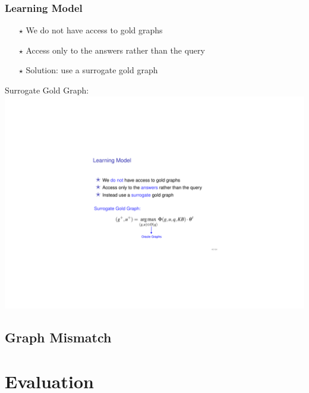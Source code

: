 \documentclass[mathserif,12pt]{beamer}
\newcommand{\hlight}[1]{{\color{blue!80} #1}}
\begin{document}
\begin{frame}
\frametitle{Learning Model}
\large 

\begin{itemize}
 \item[\huge $\star$] We \hlight{do not} have access to gold graphs
 \item[\huge $\star$] Access only to the \hlight{answers} rather than the query
 \item[\huge $\star$] Solution: use a \hlight{surrogate} gold graph
\end{itemize}


\pause
\vspace{0.5cm}
\hlight{Surrogate Gold Graph: }
\includegraphics{figures/perceptron-oracle}

\end{frame}

\subsection{Graph Mismatch}

\section{Evaluation} 
\end{document}
